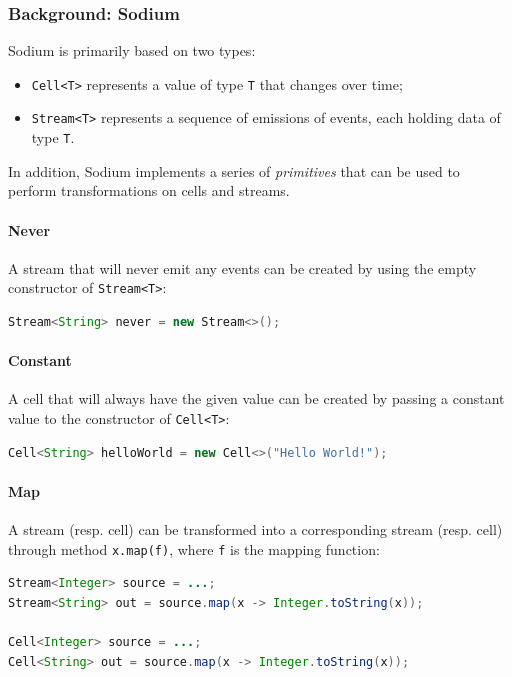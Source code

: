 
 

\subsubsection{Background: Sodium}
Sodium is primarily based on two types:
%
\begin{itemize}
  \item \texttt{Cell<T>} represents a value of type \texttt{T} that changes over time;
  \item \texttt{Stream<T>} represents a sequence of emissions of events, each holding data of type \texttt{T}.
\end{itemize}
%
In addition, Sodium implements a series of \textit{primitives} that can be used to perform transformations on cells and streams. 

\paragraph{Never}
A stream that will never emit any events can be created by using the empty constructor of \texttt{Stream<T>}:
%
\begin{lstlisting}[frame=single, language=java]
Stream<String> never = new Stream<>();
\end{lstlisting}

\paragraph{Constant}
A cell that will always have the given value can be created by passing a constant value to the constructor of \texttt{Cell<T>}:
%
\begin{lstlisting}[frame=single, language=java]
Cell<String> helloWorld = new Cell<>("Hello World!");
\end{lstlisting}


\paragraph{Map}
A stream (resp. cell) can be transformed into a corresponding stream (resp. cell) through method  \texttt{x.map(f)}, where \texttt{f} is the mapping function:
%
\begin{lstlisting}[frame=single, language=java]
Stream<Integer> source = ...;
Stream<String> out = source.map(x -> Integer.toString(x));

Cell<Integer> source = ...;
Cell<String> out = source.map(x -> Integer.toString(x));
\end{lstlisting}  

